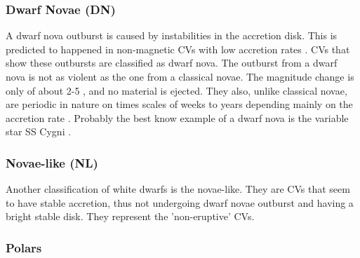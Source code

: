 \subsubsection{Dwarf Novae (DN)}

A dwarf nova outburst is caused by instabilities in the accretion disk. This is predicted to happened in non-magnetic CVs with low accretion rates \citep{osaki_accretion_1974}. CVs that show these outbursts are classified as dwarf nova. The outburst from a dwarf nova is not as violent as the one from a classical novae. The magnitude change is only of about 2-5 , and no material is ejected. They also, unlike classical novae, are periodic in nature on times scales of weeks to years depending mainly on the accretion rate \citep{shara_recent_1989}. Probably the best know example of a dwarf nova is the variable star SS Cygni \cite{cannizzo_study_1998}. 

\subsubsection{Novae-like (NL)}


Another classification of white dwarfs is the novae-like. They are CVs that seem to have stable accretion, thus not undergoing dwarf novae outburst and having a bright stable disk. They represent the 'non-eruptive' CVs.



\subsubsection{Polars}

